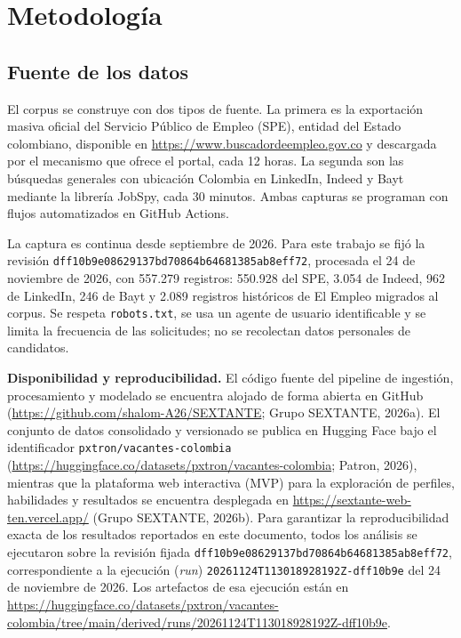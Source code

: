 \documentclass[journal]{IEEEtran}
\begin{document}
\section{Metodología}
\subsection{Fuente de los datos}
El corpus se construye con dos tipos de fuente. La primera es la exportación masiva oficial del Servicio Público de Empleo (SPE), entidad del Estado colombiano, disponible en \url{https://www.buscadordeempleo.gov.co} y descargada por el mecanismo que ofrece el portal, cada 12 horas. La segunda son las búsquedas generales con ubicación Colombia en LinkedIn, Indeed y Bayt mediante la librería JobSpy, cada 30 minutos. Ambas capturas se programan con flujos automatizados en GitHub Actions.

La captura es continua desde septiembre de 2026. Para este trabajo se fijó la revisión \texttt{dff10b9e08629137bd70864b64681385ab8eff72}, procesada el 24 de noviembre de 2026, con 557.279 registros: 550.928 del SPE, 3.054 de Indeed, 962 de LinkedIn, 246 de Bayt y 2.089 registros históricos de El Empleo migrados al corpus. Se respeta \texttt{robots.txt}, se usa un agente de usuario identificable y se limita la frecuencia de las solicitudes; no se recolectan datos personales de candidatos.

\textbf{Disponibilidad y reproducibilidad.} El código fuente del pipeline de ingestión, procesamiento y modelado se encuentra alojado de forma abierta en GitHub (\url{https://github.com/shalom-A26/SEXTANTE}; Grupo SEXTANTE, 2026a). El conjunto de datos consolidado y versionado se publica en Hugging Face bajo el identificador \texttt{pxtron/vacantes-colombia} (\url{https://huggingface.co/datasets/pxtron/vacantes-colombia}; Patron, 2026), mientras que la plataforma web interactiva (MVP) para la exploración de perfiles, habilidades y resultados se encuentra desplegada en \url{https://sextante-web-ten.vercel.app/} (Grupo SEXTANTE, 2026b). Para garantizar la reproducibilidad exacta de los resultados reportados en este documento, todos los análisis se ejecutaron sobre la revisión fijada \texttt{dff10b9e08629137bd70864b64681385ab8eff72}, correspondiente a la ejecución (\textit{run}) \texttt{20261124T113018928192Z-dff10b9e} del 24 de noviembre de 2026. Los artefactos de esa ejecución están en \url{https://huggingface.co/datasets/pxtron/vacantes-colombia/tree/main/derived/runs/20261124T113018928192Z-dff10b9e}.
\end{document}
